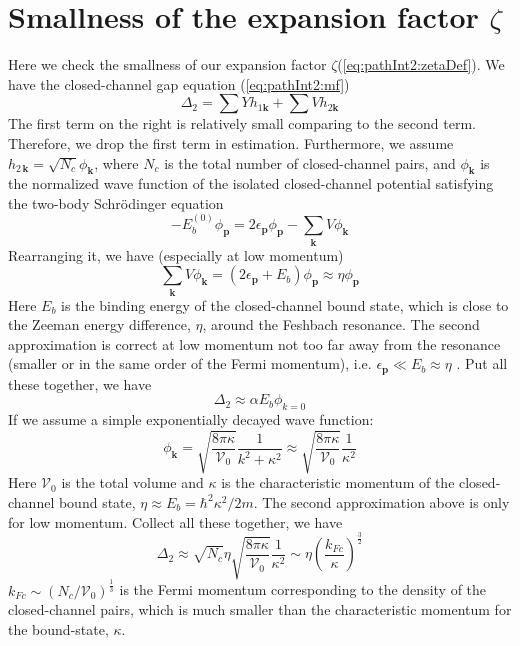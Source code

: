 \documentclass[reprint,pra]{revtex4-1}
\newcommand{\vk}{\ensuremath{\mathbf{k}}}
\newcommand{\vp}{\ensuremath{\mathbf{p}}}
\providecommand{\sch}{{Schr\"{o}dinger }}
\newcommand{\nth}[1]{\ensuremath{\frac{1}{#1}}}
\newcommand{\br}[1]{\ensuremath{\left(#1\right)}}
\begin{document}
\section{Smallness of the expansion factor $\zeta$\label{sec:pathApp:consistency}}
Here we check the smallness of our expansion factor $\zeta$(\ref{eq:pathInt2:zetaDef}).  We have the closed-channel gap equation (\ref{eq:pathInt2:mf})
\begin{equation}
\Delta_{2}=\sum{}Yh_{1\vk}+\sum{}Vh_{2\vk}\label{eq:pathInt2:mfclose}
\end{equation}
The first term on the right is relatively small comparing to the second term.  Therefore, we drop the first term in estimation.  Furthermore,  we assume $h_{2\,\vk}=\sqrt{N_{c}}\phi_{\vk}$, where $N_c$ is the total number of closed-channel pairs, and $\phi_{\vk}$ is the normalized wave function of the  isolated closed-channel potential satisfying the two-body \sch equation 
\begin{equation}\label{eq:pathInt2:phi}
-E_{b}^{(0)}\phi_{\vp}=2\epsilon_{\vp}\phi_{\vp}-\sum_{\vk}V \phi_{\vk}
\end{equation}
Rearranging it, we have (especially at low momentum)
\begin{equation*}
\sum_{\vk}V \phi_{\vk}=(2\epsilon_{\vp}+E_{b})\phi_{\vp}\approx{\eta}\phi_{\vp}
\end{equation*}
Here $E_{b}$ is the binding energy of the closed-channel bound state, which is close to the Zeeman energy difference, $\eta$, around the Feshbach resonance. The second approximation is correct at low momentum not too far away from the resonance (smaller or in the same order of the Fermi momentum), i.e. $\epsilon_{\vp}\ll{}E_{b}\approx\eta$ .  Put all these together, we have
\begin{equation*}
\Delta_{2}\approx\alpha{}E_{b}\phi_{k=0}
\end{equation*}
If we assume a simple exponentially decayed wave function:%
\begin{equation}\label{eq:pathInt2:phi2body}
\phi_{\vk}=\sqrt{\frac{8\pi\kappa}{\mathcal{V}_{0}}}\frac{1}{k^{2}+\kappa^{2}}\approx\sqrt{\frac{8\pi\kappa}{\mathcal{V}_{0}}}\frac{1}{\kappa^{2}}
\end{equation}
Here  $\mathcal{V}_{0}$ is the total volume and $\kappa$ is the characteristic momentum of the closed-channel bound state, $\eta\approx{}E_{b}=\hbar^{2}\kappa^{2}/2m$.  The second approximation above is only for  low momentum.  Collect all these together, we have
\begin{equation}
\Delta_{2}\approx\sqrt{N_{c}}\eta\sqrt{\frac{8\pi\kappa}{\mathcal{V}_{0}}}\frac{1}{\kappa^{2}}
\sim\eta\br{\frac{k_{Fc}}{\kappa}}^{\frac{3}{2}}
\end{equation}
$k_{Fc}\sim(N_c/\mathcal{V}_0)^{\nth{3}}$ is the Fermi momentum corresponding to the density of the closed-channel pairs, which is much smaller than the characteristic momentum for the bound-state, $\kappa$.  %
\end{document}
